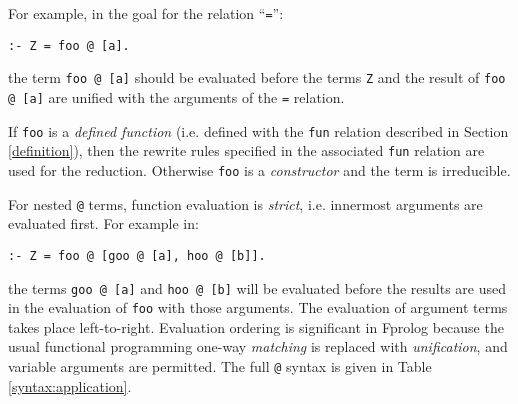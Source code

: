 \documentclass[a4paper,11pt,twoside]{article}
\begin{document}
For example, in the goal for the relation ``\texttt{=}'':

\texttt{:- Z = foo @ [a].}

the term \texttt{foo @ [a]} should be evaluated
before the terms \texttt{Z} and the result of
\texttt{foo @ [a]} are unified with
the arguments of the \texttt{=} relation.

If \texttt{foo} is a \textit{defined function} 
(i.e. defined with the \texttt{fun} relation described in 
Section \ref{definition}), then the rewrite rules specified
in the associated \texttt{fun} relation are used for the reduction.
Otherwise \texttt{foo} is a \textit{constructor} and the term is
irreducible.

For nested \texttt{@} terms, function evaluation is \textit{strict},
i.e. innermost arguments are evaluated first.
For example in:

\texttt{:- Z = foo @ [goo @ [a], hoo @ [b]].}

the terms \texttt{goo @ [a]} and \texttt{hoo @ [b]} will be evaluated
before the results are used in the evaluation of \texttt{foo} with
those arguments.  The evaluation of argument terms takes place
left-to-right.  Evaluation ordering is significant in Fprolog because
the usual functional programming one-way \textit{matching} is
replaced with \textit{unification}, and variable arguments are permitted.
The full \texttt{@} syntax is given in Table \ref{syntax:application}.
\end{document}
